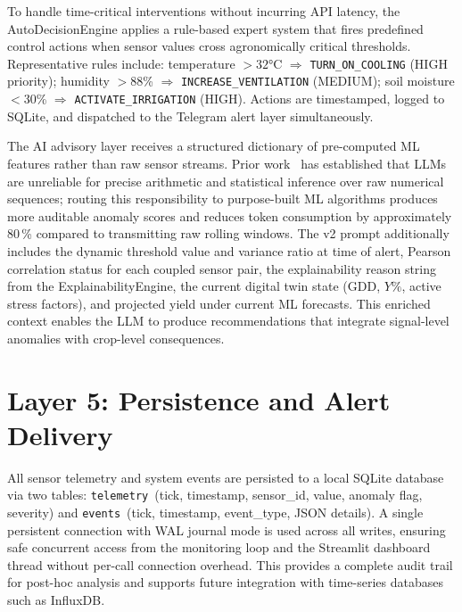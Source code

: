 \documentclass[journal,10pt,twocolumn]{IEEEtran}
\begin{document}
To handle time-critical interventions without incurring API latency,
the AutoDecisionEngine applies a rule-based expert system that fires
predefined control actions when sensor values cross agronomically
critical thresholds. Representative rules include: temperature
$>32$°C $\Rightarrow$ \texttt{TURN\_ON\_COOLING} (HIGH priority);
humidity $>88$\% $\Rightarrow$ \texttt{INCREASE\_VENTILATION} (MEDIUM);
soil moisture $<30$\% $\Rightarrow$ \texttt{ACTIVATE\_IRRIGATION}
(HIGH). Actions are timestamped, logged to SQLite, and dispatched to
the Telegram alert layer simultaneously.

The AI advisory layer receives a structured dictionary of pre-computed
ML features rather than raw sensor streams. Prior work~\cite{Bender2021,Wei2022}
has established that LLMs are unreliable for precise arithmetic and
statistical inference over raw numerical sequences; routing this
responsibility to purpose-built ML algorithms produces more auditable
anomaly scores and reduces token consumption by approximately 80\,\%
compared to transmitting raw rolling windows.
The v2 prompt additionally includes the dynamic threshold value and
variance ratio at time of alert, Pearson correlation status for each
coupled sensor pair, the explainability reason string from the
ExplainabilityEngine, the current digital twin state (GDD, $Y\%$,
active stress factors), and projected yield under current ML forecasts.
This enriched context enables the LLM to produce recommendations that
integrate signal-level anomalies with crop-level consequences.

\section{Layer 5: Persistence and Alert Delivery}
\label{sec:alert}

All sensor telemetry and system events are persisted to a local
SQLite database via two tables: \texttt{telemetry}~(tick, timestamp,
sensor\_id, value, anomaly flag, severity) and \texttt{events}~(tick,
timestamp, event\_type, JSON details).
A single persistent connection with WAL journal mode is used across
all writes, ensuring safe concurrent access from the monitoring loop
and the Streamlit dashboard thread without per-call connection
overhead.
This provides a complete audit trail for post-hoc analysis and
supports future integration with time-series databases such as
InfluxDB.
\end{document}
